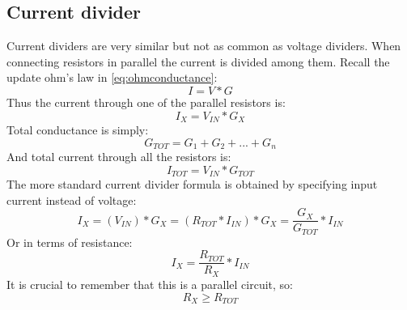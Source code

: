 \subsection{Current divider}
Current dividers are very similar but not as common as voltage dividers. 
When connecting resistors in parallel the current is divided among them. Recall 
the update ohm's law in \vref{eq:ohmconductance}:
\begin{equation*}
    I = V*G
\end{equation*}
Thus the current through one of the parallel resistors is:
\begin{equation*}
    I_X = V_{IN}*G_X
\end{equation*}
Total conductance is simply:
\begin{equation*}
    G_{TOT} = G_1 + G_2 + ... + G_n
\end{equation*}
And total current through all the resistors is:
\begin{equation*}
    I_{TOT} = V_{IN}*G_{TOT}
\end{equation*}
The more standard current divider formula is obtained by specifying input
current instead of voltage:
\begin{equation}
    I_X = (V_{IN})*G_X = (R_{TOT}*I_{IN})*G_X = \frac{G_X}{G_{TOT}}*I_{IN}
\end{equation}
Or in terms of resistance:
\begin{equation}\label{eq:currentdivider}
    I_X = \frac{R_{TOT}}{R_X} * I_{IN}
\end{equation}
It is crucial to remember that this is a parallel circuit, so:
\begin{equation*}
    R_X \geq R_{TOT}
\end{equation*}